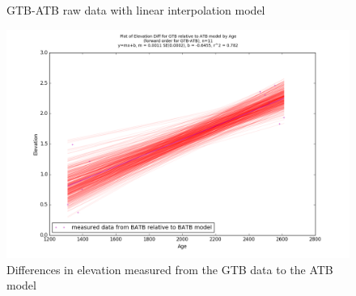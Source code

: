 \begin{figure}[h]
	\caption{GTB-ATB raw data with linear interpolation model}
	\label{fig:data_GTBxATB}
\end{figure}
\newpage

\begin{figure}[h]
	\includegraphics[width=0.9\linewidth]{data/gias/theGIA_GTB_relative_to_ATB.png}
	\caption{Differences in elevation measured from the GTB data to the ATB model}
	\label{fig:gias_GTBxATB}
\end{figure}
\newpage


